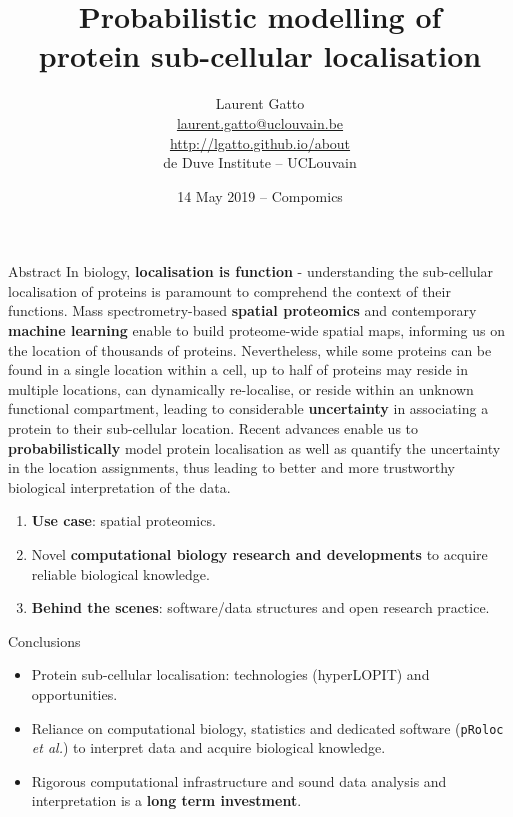 \documentclass[presentation]{beamer}
\date{14 May 2019 -- Compomics}
\title{Probabilistic modelling of \\ protein sub-cellular localisation}
\author{Laurent Gatto\\
  \url{laurent.gatto@uclouvain.be}\\
  \url{http://lgatto.github.io/about}\\
  de Duve Institute -- UCLouvain\\  
}
\begin{document}
\maketitle


\begin{frame}{Abstract}
  In biology, \textbf{localisation is function} - understanding the
  sub-cellular localisation of proteins is paramount to comprehend the
  context of their functions. Mass spectrometry-based \textbf{spatial
    proteomics} and contemporary \textbf{machine learning} enable to
  build proteome-wide spatial maps, informing us on the location of
  thousands of proteins. Nevertheless, while some proteins can be
  found in a single location within a cell, up to half of proteins may
  reside in multiple locations, can dynamically re-localise, or reside
  within an unknown functional compartment, leading to considerable
  \textbf{uncertainty} in associating a protein to their sub-cellular
  location. Recent advances enable us to \textbf{probabilistically}
  model protein localisation as well as quantify the uncertainty in
  the location assignments, thus leading to better and more
  trustworthy biological interpretation of the data.
\end{frame}


\begin{frame}
  \begin{block}{}
  \begin{enumerate}
  \item \textbf{Use case}: spatial proteomics.
  \item Novel \textbf{computational biology research and developments}
    to acquire reliable biological knowledge.
  \item \textbf{Behind the scenes}: software/data structures and open research
    practice.
  \end{enumerate}
  \end{block}
\end{frame}







\begin{frame}[fragile]{Conclusions}
  \begin{itemize}
  \item Protein sub-cellular localisation: technologies (hyperLOPIT)
    and opportunities.

  \item Reliance on computational biology, statistics and dedicated
    software (\texttt{pRoloc} \textit{et al.}) to interpret data and
    acquire biological knowledge.

  \item Rigorous computational infrastructure and sound data analysis
    and interpretation is a \textbf{long term investment}.

  \end{itemize}

\end{frame}
\end{document}
